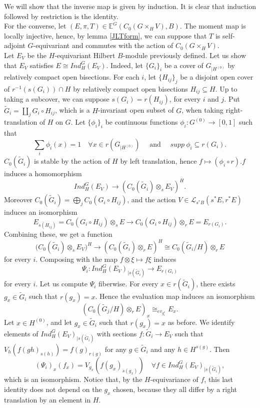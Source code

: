 \begin{dem} We will show that the inverse map is given by induction. It is clear that induction followed by restriction is the identity.\\ 

For the converse, let $(E,\pi,T)\in \mathbb E^G(C_0(G\times_H V),B)$. The moment map is locally injective, hence, by lemma \ref{JLTform}, we can suppose that $T$ is self-adjoint $G$-equivariant and commutes with the action of $C_0(G\times_H V)$.\\

Let $E_V$ be the $H$-equivariant Hilbert $B$-module previously defined. Let us show that $E_{V}$ satisfies $E\cong Ind_H^G (E_V)$. Indeed, let $\{G_i\}_i$ be a cover of $G_{|H^{(0)}}$ by relatively compact open bisections. For each $i$, let $\{H_{ij}\}_j$ be a disjoint open cover of $r^{-1}( s(G_i))\cap H$ by relatively compact open bisections $H_{ij} \subseteq H$. Up to taking a subcover, we can suppose $s(G_i) = r(H_{ij})$, for every $i$ and $j$. Put $\tilde G_i = \coprod_j G_i \circ H_{ij}$, which is a $H$-invariant open subset of $G$, when taking right-translation of $H$ on $G$. Let $\{\phi_i\}_i$ be continuous functions $\phi_i : G^{(0)}\rightarrow [0,1]$ such that 
\[\sum_{i} \phi_i(x) = 1\quad \forall x\in r(G_{|H^{(0)}}) \quad \text{ and } \quad supp \ \phi_i\subseteq r(G_i) .\]
$C_0(\tilde G_i)$ is stable by the action of $H$ by left translation, hence $f\mapsto (\phi_i\circ r) . f$ induces a homomorphism 
\[Ind_H^G(E_V) \rightarrow \left( C_0(\tilde G_i)\otimes_s E_V\right)^H .\]  
Moreover $C_0(\tilde G_i) = \bigoplus_j C_0(G_i\circ H_{ij})$, and the action $V\in \mathcal L_{s^*B}(s^* E, r^* E)$ induces an isomorphism
\[ E_{s(H_{ij})}=C_0(G_i\circ H_{ij})\otimes_s E \rightarrow C_0(G_i\circ H_{ij})\otimes_r E = E_{r(G_{i})}. \]
Combining these, we get a function 
\[ \Big(C_0(\tilde G_i)\otimes_s E_V\Big)^H \rightarrow (C_0(\tilde G_i)\otimes_r E)^H \cong C_0(\tilde G_i/H)\otimes_r E \]
for every $i$. Composing with the map $f\otimes \xi \mapsto f\xi$ induces
\[\Psi_i : Ind_H^G(E_V)_{|s(\tilde G_i)} \rightarrow E_{r(G_i)}\]
for every $i$. 
Let us compute $\Psi_i$ fiberwise. For every $x\in r(\tilde G_i)$, there exists $g_x\in \tilde G_i$ such that $r(g_x)=x$. Hence the evaluation map induces an isomorphism 
\[\left( C_0(\tilde G_j / H) \otimes_r E \right)_x \cong_{ev_{g_i^x}} E_x.\] 
Let $x\in H^{(0)}$, and let $g_x \in \tilde G_i$ such that $r(g_x) = x$ as before. We identify elements of $Ind_H^G(E_V)_{|s(\tilde G_i)}$ with sections $f : \tilde G_i \rightarrow E_V$ such that $V_h(f(gh)_{s(h)})= f(g)_{r(g)}$ for any $g\in \tilde G_i$ and any $h\in H^{s(g)}$. Then 
\[ (\Psi_i)_x(f_x) = V_{g_x}\left( f(g_{x})_{s(g_x)} \right)\quad \forall f\in Ind_H^G(E_V)_{|s(\tilde G_i)}, \]
which is an isomorphism. Notice that, by the $H$-equivariance of $f$, this last identity does not depend on the $g_x$ chosen, because they all differ by a right translation by an element in $H$. \\


\end{dem}
